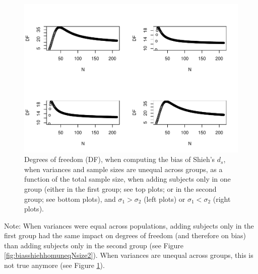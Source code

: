 \documentclass[
  english,
  man,mask]{apa6}
\begin{document}
\begin{figure}
\centering
\includegraphics{Theoretical-Bias-of-all-estimators-as-a-function-of-population-parameters_files/figure-latex/biasshiehhetuneqNsize2-1.pdf}
\caption{\label{fig:biasshiehhetuneqNsize2}Degrees of freedom (DF), when computing the bias of Shieh's \(d_s\), when variances and sample sizes are unequal across groups, as a function of the total sample size, when adding subjects only in one group (either in the first group; see top plots; or in the second group; see bottom plots), and \(\sigma_1 > \sigma_2\) (left plots) or \(\sigma_1 < \sigma_2\) (right plots).}
\end{figure}

Note: When variances were equal across populations, adding subjects only in the first group had the same impact on degrees of freedom (and therefore on bias) than adding subjects only in the second group (see Figure \ref{fig:biasshiehhomuneqNsize2}). When variances are unequal across groups, this is not true anymore (see Figure \ref{fig:biasshiehhetuneqNsize2}).
\end{document}
